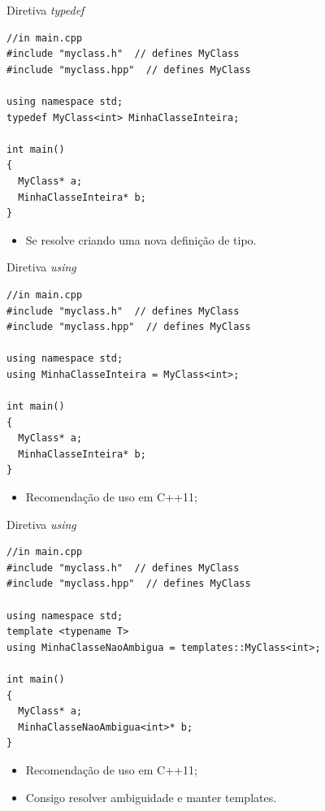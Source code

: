 \documentclass[12pt,table,xcolor={dvipsnames}]{beamer}
\begin{document}
\begin{frame}[fragile]{Diretiva \textit{typedef}}
\begin{lstlisting}
//in main.cpp
#include "myclass.h"  // defines MyClass
#include "myclass.hpp"  // defines MyClass

using namespace std;
typedef MyClass<int> MinhaClasseInteira;

int main()
{
  MyClass* a;
  MinhaClasseInteira* b;
}
\end{lstlisting}
\begin{itemize}
\item Se resolve criando uma nova definição de tipo.
\end{itemize}
\end{frame}

\begin{frame}[fragile]{Diretiva \textit{using}}
\begin{lstlisting}
//in main.cpp
#include "myclass.h"  // defines MyClass
#include "myclass.hpp"  // defines MyClass

using namespace std;
using MinhaClasseInteira = MyClass<int>; 

int main()
{
  MyClass* a;
  MinhaClasseInteira* b;
}
\end{lstlisting}
\begin{itemize}
\item Recomendação de uso em C++11;
\end{itemize}
\end{frame}

\begin{frame}[fragile]{Diretiva \textit{using}}
\begin{lstlisting}
//in main.cpp
#include "myclass.h"  // defines MyClass
#include "myclass.hpp"  // defines MyClass

using namespace std;
template <typename T>
using MinhaClasseNaoAmbigua = templates::MyClass<int>;

int main()
{
  MyClass* a;
  MinhaClasseNaoAmbigua<int>* b;
}
\end{lstlisting}
\begin{itemize}
\item Recomendação de uso em C++11;
\item Consigo resolver ambiguidade e manter templates.
\end{itemize}
\end{frame}
\end{document}
